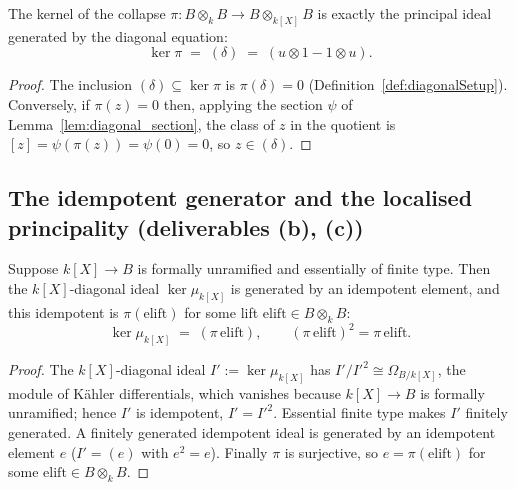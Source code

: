 \begin{theorem}
  \label{thm:ker_baseChange}
  \leanok
  The kernel of the collapse \(\pi \colon B \otimes_k B \to B \otimes_{k[X]} B\) is exactly the
  principal ideal generated by the diagonal equation:
  \[
    \ker \pi \;=\; (\delta) \;=\; (u \otimes 1 - 1 \otimes u).
  \]
\end{theorem}
\begin{proof}
  \leanok
  The inclusion \((\delta) \subseteq \ker \pi\) is \(\pi(\delta) = 0\)
  (Definition~\ref{def:diagonalSetup}). Conversely, if \(\pi(z) = 0\) then, applying the section
  \(\psi\) of Lemma~\ref{lem:diagonal_section}, the class of \(z\) in the quotient is \([z] =
  \psi(\pi(z)) = \psi(0) = 0\), so \(z \in (\delta)\).
\end{proof}

\subsection{The idempotent generator and the localised principality (deliverables (b), (c))}

\begin{theorem}
  \label{thm:exists_idempotent_lift}
  \leanok
  Suppose \(k[X] \to B\) is formally unramified and essentially of finite type. Then the
  \(k[X]\)-diagonal ideal \(\ker \mu_{k[X]}\) is generated by an idempotent element, and this
  idempotent is \(\pi(\mathrm{elift})\) for some lift \(\mathrm{elift} \in B \otimes_k B\):
  \[
    \ker \mu_{k[X]} \;=\; (\pi\,\mathrm{elift}), \qquad (\pi\,\mathrm{elift})^2 = \pi\,\mathrm{elift}.
  \]
\end{theorem}
\begin{proof}
  \leanok
  The \(k[X]\)-diagonal ideal \(I' := \ker \mu_{k[X]}\) has \(I'/I'^2 \cong \Omega_{B/k[X]}\), the
  module of K\"ahler differentials, which vanishes because \(k[X] \to B\) is formally unramified;
  hence \(I'\) is idempotent, \(I' = I'^2\). Essential finite type makes \(I'\) finitely
  generated. A finitely generated idempotent ideal is generated by an idempotent element \(e\)
  (\(I' = (e)\) with \(e^2 = e\)). Finally \(\pi\) is surjective, so \(e = \pi(\mathrm{elift})\)
  for some \(\mathrm{elift} \in B \otimes_k B\).
\end{proof}

